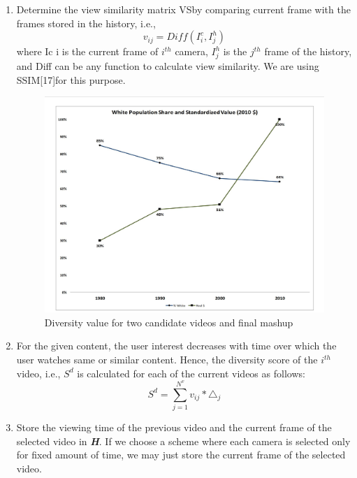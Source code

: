 \documentclass{sig-alternate}
\begin{document}
\begin{enumerate}
\item Determine the view similarity matrix VSby comparing current frame with the frames stored in the history, i.e.,
\begin{equation}
 v_{ij} = Diff(I^c_i ,I^h_j) 
\end{equation} where Ic i is the current frame of \(i^{th}\) camera, \(I^h_j\) is the \(j^{th}\) frame of the history, and Diff can be any function to calculate view similarity. We are using SSIM[17]for this purpose.

 \begin{figure}[h!]
\includegraphics[width = \linewidth]{5.jpg}
\caption{Diversity value for two candidate videos and ﬁnal mashup}
\label{fig: 5}
\end{figure}

\item  For the given content, the user interest decreases with time over which the user watches same or similar content. Hence, the diversity score of the \(i^{th}\) video, i.e., \(S^d\) is calculated for each of the current videos as follows:
\begin{equation}
S^d = \sum_{j=1}^{N^v}v_{ij} * \triangle_j
\end{equation}
\item Store the viewing time of the previous video and the current frame of the selected video in \textbf{\textit{H}}. If we choose a scheme where each camera is selected only for fixed amount of time, we may just store the current frame of the selected video.
\end{enumerate}
\end{document}
